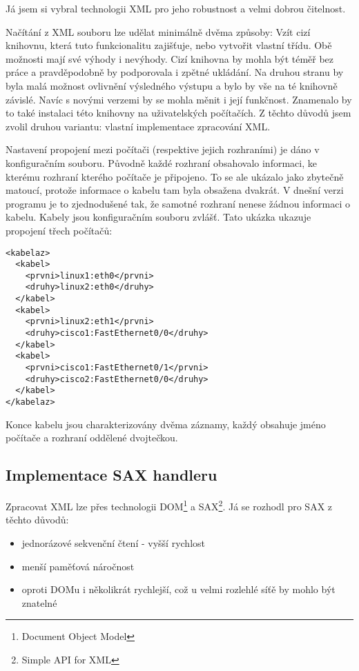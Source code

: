 Já jsem si vybral technologii XML pro jeho robustnost a velmi dobrou čitelnost.

Načítání z XML souboru lze udělat minimálně dvěma způsoby: Vzít cizí knihovnu, která tuto funkcionalitu zajišťuje, nebo vytvořit vlastní třídu. Obě možnosti mají své výhody i nevýhody. Cizí knihovna by mohla být téměř bez práce a pravděpodobně by podporovala i zpětné ukládání. Na druhou stranu by byla malá možnost ovlivnění výsledného výstupu a bylo by vše na té knihovně závislé. Navíc s novými verzemi by se mohla měnit i její funkčnost. Znamenalo by to také instalaci této knihovny na uživatelských počítačích. Z těchto důvodů jsem zvolil druhou variantu: vlastní implementace zpracování XML. 

Nastavení propojení mezi počítači (respektive jejich rozhraními) je dáno v konfiguračním souboru. Původně každé rozhraní obsahovalo informaci, ke kterému rozhraní kterého počítače je připojeno. To se ale ukázalo jako zbytečně matoucí, protože informace o kabelu tam byla obsažena dvakrát. V dnešní verzi programu je to zjednodušené tak, že samotné rozhraní nenese žádnou informaci o kabelu. Kabely jsou konfiguračním souboru zvlášť. Tato ukázka ukazuje propojení třech počítačů:

\begin{verbatim}
<kabelaz>
  <kabel>
    <prvni>linux1:eth0</prvni>
    <druhy>linux2:eth0</druhy>
  </kabel>
  <kabel>
    <prvni>linux2:eth1</prvni>
    <druhy>cisco1:FastEthernet0/0</druhy>
  </kabel>
  <kabel>
    <prvni>cisco1:FastEthernet0/1</prvni>
    <druhy>cisco2:FastEthernet0/0</druhy>
  </kabel>
</kabelaz>
\end{verbatim} 

Konce kabelu jsou charakterizovány dvěma záznamy, každý obsahuje jméno počítače a rozhraní oddělené dvojtečkou.


\subsection{Implementace SAX handleru}
Zpracovat XML lze přes technologii DOM\footnote{Document Object Model} a SAX\footnote{Simple API for XML}. Já se rozhodl pro SAX z těchto důvodů:
\begin{itemize}
 \item jednorázové sekvenční čtení - vyšší rychlost
 \item menší paměťová náročnost
 \item oproti DOMu i několikrát rychlejší, což u velmi rozlehlé síťě by mohlo být znatelné
\end{itemize}

